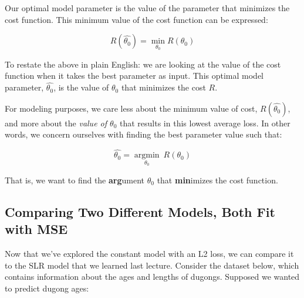\documentclass[
  letterpaper,
  DIV=11,
  numbers=noendperiod]{scrreprt}
\begin{document}
Our optimal model parameter is the value of the parameter that minimizes
the cost function. This minimum value of the cost function can be
expressed:

\[R(\hat{\theta_0}) = \min_{\theta_0} R(\theta_0)\]

To restate the above in plain English: we are looking at the value of
the cost function when it takes the best parameter as input. This
optimal model parameter, \(\hat{\theta_0}\), is the value of
\(\theta_0\) that minimizes the cost \(R\).

For modeling purposes, we care less about the minimum value of cost,
\(R(\hat{\theta_0})\), and more about the \emph{value of \(\theta_0\)}
that results in this lowest average loss. In other words, we concern
ourselves with finding the best parameter value such that:

\[\hat{\theta_0} = \underset{\theta_0}{\operatorname{\arg\min}}\:R(\theta_0)\]

That is, we want to find the \textbf{arg}ument \(\theta_0\) that
\textbf{min}imizes the cost function.

\subsection{Comparing Two Different Models, Both Fit with
MSE}\label{comparing-two-different-models-both-fit-with-mse}

Now that we've explored the constant model with an L2 loss, we can
compare it to the SLR model that we learned last lecture. Consider the
dataset below, which contains information about the ages and lengths of
dugongs. Supposed we wanted to predict dugong ages:
\end{document}

